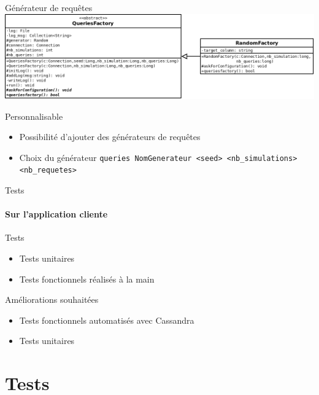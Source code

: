 \documentclass{beamer}
\begin{document}
\begin{frame}{Générateur de requêtes}
\centering
    \includegraphics[scale=0.3]{architecture_req}


  \begin{block}{Personnalisable}
   \begin{itemize}
    \item Possibilité d'ajouter des générateurs de requêtes
    \item Choix du générateur \newline \texttt{queries NomGenerateur <seed> <nb\_simulations> <nb\_requetes>}
   \end{itemize}
  \end{block}
\end{frame}

\begin{frame}{Tests}
 \framesubtitle{Sur l'application cliente}
 \begin{block}{Tests }
	\begin{itemize}
	\item Tests unitaires
	\item Tests fonctionnels réalisés à la main
	\end{itemize}
 \end{block}
  
 \begin{block}{Améliorations souhaitées}
 	\begin{itemize}
 		\item Tests fonctionnels automatisés avec Cassandra
 		\item Tests unitaires 
 	\end{itemize}
 \end{block}
 
\end{frame}

\section{Tests}
\end{document}

